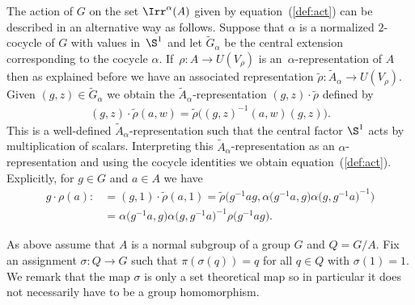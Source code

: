 \begin{Rem}The action of $G$ on the set $\Irr^{\alpha}(A)$ given by equation~(\ref{def:act}) can be
described in an alternative way as follows. Suppose that $\alpha$ is a normalized $2$-cocycle of
$G$ with values in~$\S^{1}$ and let $\widetilde{G}_{\alpha}$ be the central extension corresponding
to the cocycle $\alpha$. If~$\rho\colon A\rightarrow U(V_{\rho})$ is an~$\alpha$-representation of $A$
then as explained before we have an associated representation \mbox{$\tilde{\rho}\colon \tilde{A}_{\alpha}\to U(V_{\rho})$}.
Given $(g,z)\in \widetilde{G}_{\alpha}$ we obtain the $\tilde{A}_{\alpha}$-representation
$(g,z)\cdot \tilde{\rho}$ defined by
\begin{gather*}
(g,z)\cdot \tilde{\rho}(a,w)=\tilde{\rho}\big((g,z)^{-1}(a,w)(g,z)\big).
\end{gather*}
This is a well-defined $\tilde{A}_{\alpha}$-representation such that the central factor
$\S^{1}$ acts by multiplication of scalars. Interpreting this $\tilde{A}_{\alpha}$-representation as an
$\alpha$-representation and using the cocycle identities we obtain equation~(\ref{def:act}). Explicitly,
for $g\in G$ and $a\in A$ we have
\begin{align*}
g\cdot \rho(a):\!&=(g,1)\cdot \tilde{\rho}(a,1)= \tilde{\rho}\big(g^{-1}ag,\alpha\big(g^{-1}a,g\big)\alpha\big(g,g^{-1}a\big)^{-1}\big)
\\
&=\alpha\big(g^{-1}a,g\big)\alpha\big(g,g^{-1}a\big)^{-1} \rho\big(g^{-1}ag\big).
\end{align*}
\end{Rem}


As above assume that $A$ is a normal subgroup of a group $G$ and $Q=G/A$. Fix an assignment
$\sigma \colon Q \rightarrow G$ such that $\pi(\sigma(q)) = q$ for all $q \in Q$ with $\sigma(1)
= 1$. We remark that the map $\sigma$ is only a set theoretical map so in particular it does
not necessarily have to be a group homomorphism.

